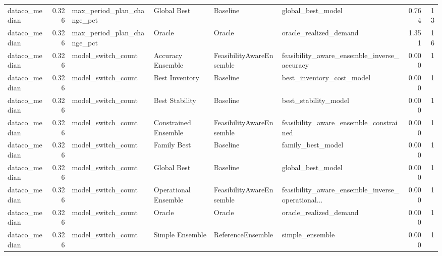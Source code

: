 \begin{table}
{\begin{tabular}{lrllllrr}
 dataco\_median &             0.326 &  max\_period\_plan\_change\_pct &           Global Best &                  Baseline &                                  global\_best\_model &         0.764 &              13 \\
 dataco\_median &             0.326 &  max\_period\_plan\_change\_pct &                Oracle &                    Oracle &                             oracle\_realized\_demand &         1.351 &              16 \\
 dataco\_median &             0.326 &          model\_switch\_count &     Accuracy Ensemble &  FeasibilityAwareEnsemble &        feasibility\_aware\_ensemble\_inverse\_accuracy &         0.000 &               1 \\
 dataco\_median &             0.326 &          model\_switch\_count &        Best Inventory &                  Baseline &                          best\_inventory\_cost\_model &         0.000 &               1 \\
 dataco\_median &             0.326 &          model\_switch\_count &        Best Stability &                  Baseline &                               best\_stability\_model &         0.000 &               1 \\
 dataco\_median &             0.326 &          model\_switch\_count &  Constrained Ensemble &  FeasibilityAwareEnsemble &             feasibility\_aware\_ensemble\_constrained &         0.000 &               1 \\
 dataco\_median &             0.326 &          model\_switch\_count &           Family Best &                  Baseline &                                  family\_best\_model &         0.000 &               1 \\
 dataco\_median &             0.326 &          model\_switch\_count &           Global Best &                  Baseline &                                  global\_best\_model &         0.000 &               1 \\
 dataco\_median &             0.326 &          model\_switch\_count &  Operational Ensemble &  FeasibilityAwareEnsemble &  feasibility\_aware\_ensemble\_inverse\_operational... &         0.000 &               1 \\
 dataco\_median &             0.326 &          model\_switch\_count &                Oracle &                    Oracle &                             oracle\_realized\_demand &         0.000 &               1 \\
 dataco\_median &             0.326 &          model\_switch\_count &       Simple Ensemble &         ReferenceEnsemble &                                    simple\_ensemble &         0.000 &               1 \\

\end{tabular}}
\end{table}
